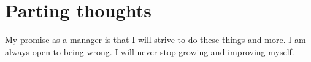 \documentclass[11pt]{amsart}
\begin{document}








\section{Parting thoughts}
My promise as a manager is that I will strive to do these things and more. I am always open to being wrong. I will never stop growing and improving myself. 

\end{document}
